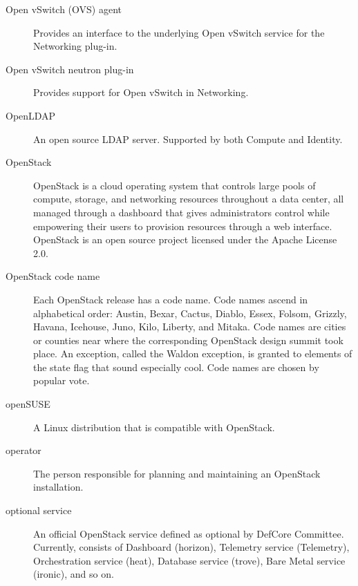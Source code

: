 \documentclass[letterpaper,10pt,english]{sphinxmanual}
\begin{document}
\begin{description}
\item[{Open vSwitch (OVS) agent}] \leavevmode{}\label{_source/glossary:term-open-vswitch-ovs-agent}
Provides an interface to the underlying Open vSwitch service for
the Networking plug-in.

\item[{Open vSwitch neutron plug-in}] \leavevmode{}\label{_source/glossary:term-open-vswitch-neutron-plug-in}
Provides support for Open vSwitch in Networking.

\item[{OpenLDAP}] \leavevmode{}\label{_source/glossary:term-openldap}
An open source LDAP server. Supported by both Compute and
Identity.

\item[{OpenStack}] \leavevmode{}\label{_source/glossary:term-openstack}
OpenStack is a cloud operating system that controls large pools
of compute, storage, and networking resources throughout a data
center, all managed through a dashboard that gives administrators
control while empowering their users to provision resources through a
web interface. OpenStack is an open source project licensed under the
Apache License 2.0.

\item[{OpenStack code name}] \leavevmode{}\label{_source/glossary:term-openstack-code-name}
Each OpenStack release has a code name. Code names ascend in
alphabetical order: Austin, Bexar, Cactus, Diablo, Essex,
Folsom, Grizzly, Havana, Icehouse, Juno, Kilo, Liberty,
and Mitaka.
Code names are cities or counties near where the
corresponding OpenStack design summit took place. An
exception, called the Waldon exception, is granted to
elements of the state flag that sound especially cool. Code
names are chosen by popular vote.

\item[{openSUSE}] \leavevmode{}\label{_source/glossary:term-opensuse}
A Linux distribution that is compatible with OpenStack.

\item[{operator}] \leavevmode{}\label{_source/glossary:term-operator}
The person responsible for planning and maintaining an OpenStack
installation.

\item[{optional service}] \leavevmode{}\label{_source/glossary:term-optional-service}
An official OpenStack service defined as optional by
DefCore Committee. Currently, consists of
Dashboard (horizon), Telemetry service (Telemetry),
Orchestration service (heat), Database service (trove),
Bare Metal service (ironic), and so on.


\end{description}
\end{document}
